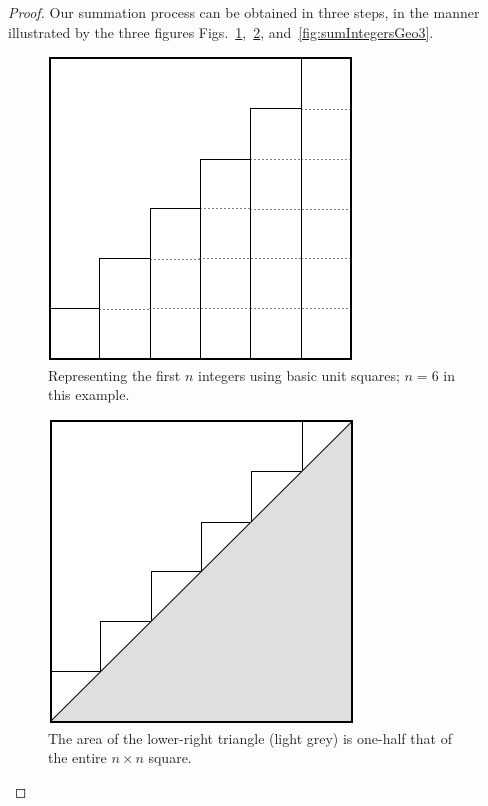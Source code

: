 \begin{proof}
Our summation process can be obtained in three steps, in the manner
illustrated by the three figures
Figs.~\ref{fig:sumIntegersGeo1},~\ref{fig:sumIntegersGeo2},
and~\ref{fig:sumIntegersGeo3}.
\begin{figure}[ht]
\begin{center}
       \includegraphics[scale=0.4]{FiguresMaths/SumIntegersGeometricBasis}
\caption{Representing the first $n$ integers using basic unit squares; $n=6$ in this example.}
       \label{fig:sumIntegersGeo1}
\end{center}
\end{figure}
\begin{figure}[ht]
\begin{center}
       \includegraphics[scale=0.4]{FiguresMaths/SumIntegersGeometricIntermediate}
\caption{The area of the lower-right triangle (light grey) is one-half that of
  the entire $n \times n$ square.}
       \label{fig:sumIntegersGeo2}
\end{center}
\end{figure}

\end{proof}
